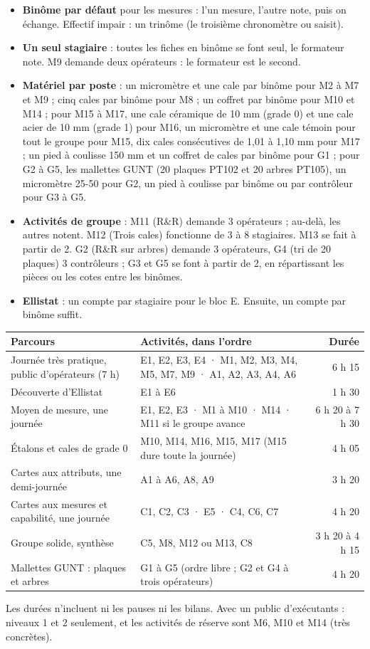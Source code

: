 \documentclass[10pt,a4paper]{article}
\begin{document}
\begin{itemize}
\item \textbf{Binôme par défaut} pour les mesures : l'un mesure, l'autre note, puis on échange. Effectif impair : un trinôme (le troisième chronomètre ou saisit).
\item \textbf{Un seul stagiaire} : toutes les fiches en binôme se font seul, le formateur note. M9 demande deux opérateurs : le formateur est le second.
\item \textbf{Matériel par poste} : un micromètre et une cale par binôme pour M2 à M7 et M9 ; cinq cales par binôme pour M8 ; un coffret par binôme pour M10 et M14 ; pour M15 à M17, une cale céramique de 10 mm (grade 0) et une cale acier de 10 mm (grade 1) pour M16, un micromètre et une cale témoin pour tout le groupe pour M15, dix cales consécutives de 1,01 à 1,10 mm pour M17 ; un pied à coulisse 150 mm et un coffret de cales par binôme pour G1 ; pour G2 à G5, les mallettes GUNT (20 plaques PT102 et 20 arbres PT105), un micromètre 25-50 pour G2, un pied à coulisse par binôme ou par contrôleur pour G3 à G5.
\item \textbf{Activités de groupe} : M11 (R\&R) demande 3 opérateurs ; au-delà, les autres notent. M12 (Trois cales) fonctionne de 3 à 8 stagiaires. M13 se fait à partir de 2. G2 (R\&R sur arbres) demande 3 opérateurs, G4 (tri de 20 plaques) 3 contrôleurs ; G3 et G5 se font à partir de 2, en répartissant les pièces ou les cotes entre les binômes.
\item \textbf{Ellistat} : un compte par stagiaire pour le bloc E. Ensuite, un compte par binôme suffit.
\end{itemize}

\renewcommand{\arraystretch}{1.25}
\begin{tabularx}{\linewidth}{@{}p{43mm} X r@{}}
\toprule
\textbf{Parcours} & \textbf{Activités, dans l'ordre} & \textbf{Durée}\\\midrule
Journée très pratique, public d'opérateurs (7 h) & E1, E2, E3, E4 · M1, M2, M3, M4, M5, M7, M9 · A1, A2, A3, A4, A6 & 6 h 15\\
Découverte d'Ellistat & E1 à E6 & 1 h 30\\
Moyen de mesure, une journée & E1, E2, E3 · M1 à M10 · M14 · M11 si le groupe avance & 6 h 20 à 7 h 30\\
Étalons et cales de grade 0 & M10, M14, M16, M15, M17 (M15 dure toute la journée) & 4 h 05\\
Cartes aux attributs, une demi-journée & A1 à A6, A8, A9 & 3 h 20\\
Cartes aux mesures et capabilité, une journée & C1, C2, C3 · E5 · C4, C6, C7 & 4 h 20\\
Groupe solide, synthèse & C5, M8, M12 ou M13, C8 & 3 h 20 à 4 h 15\\
Mallettes GUNT : plaques et arbres & G1 à G5 (ordre libre ; G2 et G4 à trois opérateurs) & 4 h 20\\
\bottomrule
\end{tabularx}
{\small Les durées n'incluent ni les pauses ni les bilans. Avec un public d'exécutants : niveaux 1 et 2 seulement, et les activités de réserve sont M6, M10 et M14 (très concrètes).}
\end{document}

